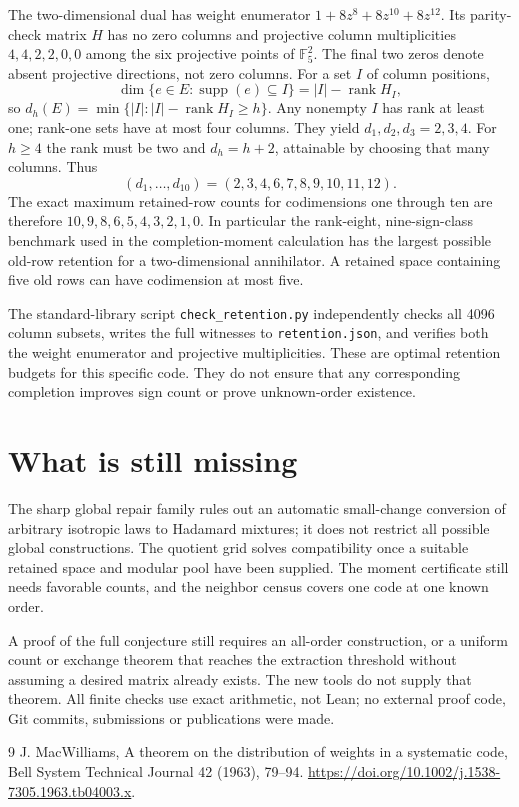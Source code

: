 \documentclass[11pt]{article}
\begin{document}
The two-dimensional dual has weight enumerator
$1+8z^8+8z^{10}+8z^{12}$. Its parity-check matrix $H$ has no zero
columns and projective column multiplicities $4,4,2,2,0,0$ among
the six projective points of $\mathbb F_5^2$. The final two zeros
denote absent projective directions, not zero columns. For a set
$I$ of column positions,
\[
 \dim\{e\in E:\operatorname{supp}(e)\subseteq I\}
 =|I|-\operatorname{rank}H_I,
\]
so $d_h(E)=\min\{|I|:|I|-\operatorname{rank}H_I\ge h\}$.
Any nonempty $I$ has rank at least one; rank-one sets have at most
four columns. They yield $d_1,d_2,d_3=2,3,4$. For $h\ge4$ the
rank must be two and $d_h=h+2$, attainable by choosing that many
columns. Thus
\[
 (d_1,\ldots,d_{10})=(2,3,4,6,7,8,9,10,11,12).
\]
The exact maximum retained-row counts for codimensions one through
ten are therefore $10,9,8,6,5,4,3,2,1,0$.
In particular the rank-eight, nine-sign-class benchmark used in the
completion-moment calculation has the largest possible old-row
retention for a two-dimensional annihilator. A retained space
containing five old rows can have codimension at most five.

The standard-library script \texttt{check\_retention.py} independently
checks all 4096 column subsets, writes the full witnesses to
\texttt{retention.json}, and verifies both the weight enumerator and
projective multiplicities. These are optimal retention budgets for
this specific code. They do not ensure that any corresponding
completion improves sign count or prove unknown-order existence.

\section{What is still missing}
The sharp global repair family rules out an automatic small-change
conversion of arbitrary isotropic laws to Hadamard mixtures; it
does not restrict all possible global constructions.
The quotient grid solves compatibility once a suitable retained
space and modular pool have been supplied. The moment certificate
still needs favorable counts, and the neighbor census covers one
code at one known order.

A proof of the full conjecture still requires an all-order
construction, or a uniform count or exchange theorem that reaches
the extraction threshold without assuming a desired matrix already
exists. The new tools do not supply that theorem. All finite
checks use exact arithmetic, not Lean; no external proof code,
Git commits, submissions or publications were made.
\begin{thebibliography}{9}
 J. MacWilliams, A theorem on the distribution of weights
in a systematic code, Bell System Technical Journal 42 (1963),
79--94. \url{https://doi.org/10.1002/j.1538-7305.1963.tb04003.x}.
\end{thebibliography}
\end{document}
